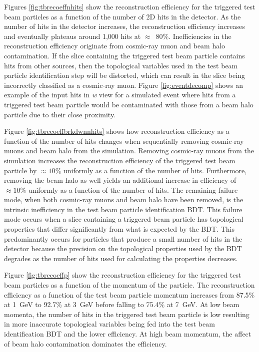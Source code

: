 Figures \ref{fig:tbrecoeffnhits} show the reconstruction efficiency for the triggered test beam particles as a function of the number of 2D hits in the detector.  As the number of hits in the detector increases, the reconstruction efficiency increases and eventually plateaus around 1,000 hits at $\approx$~80\%.  Inefficiencies in the reconstruction efficiency originate from cosmic-ray muon and beam halo contamination.  If the slice containing the triggered test beam particle contains hits from other sources, then the topological variables used in the test beam particle identification step will be distorted, which can result in the slice being incorrectly classified as a cosmic-ray muon.  Figure \ref{fig:eventdecomp} shows an example of the input hits in \textit{w} view for a simulated event where hits from a triggered test beam particle would be contaminated with those from a beam halo particle due to their close proximity.  

Figure \ref{fig:tbrecoeffbrkdwnnhits} shows how reconstruction efficiency as a function of the number of hits changes when sequentially removing cosmic-ray muons and beam halo from the simulation.  Removing cosmic-ray muons from the simulation increases the reconstruction efficiency of the triggered test beam particle by $\approx 10\%$ uniformly as a function of the number of hits.  Furthermore, removing the beam halo as well yields an additional increase in efficiency of $\approx 10\%$ uniformly as a function of the number of hits.  The remaining failure mode, when both cosmic-ray muons and beam halo have been removed, is the intrinsic inefficiency in the test beam particle identification BDT.  This failure mode occurs when a slice containing a triggered beam particle has topological properties that differ significantly from what is expected by the BDT.  This predominantly occurs for particles that produce a small number of hits in the detector because the precision on the topological properties used by the BDT degrades as the number of hits used for calculating the properties decreases.  

Figure \ref{fig:tbrecoeffp} show the reconstruction efficiency for the triggered test beam particles as a function of the momentum of the particle.  The reconstruction efficiency as a function of the test beam particle momentum increases from 87.5\% at 1~GeV to 92.7\% at 3~GeV before falling to 75.4\% at 7~GeV.  At low beam momenta, the number of hits in the triggered test beam particle is low resulting in more inaccurate topological variables being fed into the test beam identification BDT and the lower efficiency.  At high beam momentum, the affect of beam halo contamination dominates the efficiency.  

